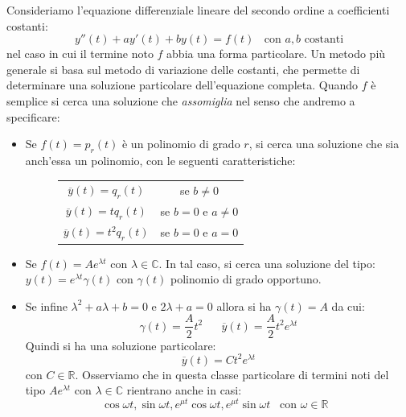\documentclass[a4paper]{article}
\numberwithin{equation}{subsection}
\begin{document}
Consideriamo l'equazione differenziale lineare del secondo ordine a coefficienti costanti:
\[y''(t) + ay'(t) + by(t) = f(t) \; \; \text{ con $a, b$ costanti}\]
nel caso in cui il termine noto $f$ abbia una forma particolare. 
Un metodo più generale si basa sul metodo di variazione delle costanti, che permette di determinare una soluzione particolare dell'equazione completa.
Quando $f$ è semplice si cerca una soluzione che \textit{assomiglia} nel senso che andremo a specificare:
\begin{itemize}
    \item Se $f(t) = p_r(t)$ è un polinomio di grado $r$, si cerca una soluzione che sia anch'essa un polinomio, con le seguenti caratteristiche:
    \begin{figure}[H]
        \centering
        \begin{tabular}{|c|c|}
            \hline
            $\overline{y}(t) = q_r(t)$ & se $b \neq 0$\\
            $\overline{y}(t) = tq_r(t)$ & se $b = 0$ e $a \neq 0$\\
            $\overline{y}(t) = t^2q_r(t)$ & se $b = 0$ e $a = 0$\\
            \hline
        \end{tabular}
    
    \end{figure}
    \item Se $f(t) = Ae^{\lambda t}$ con $\lambda \in \mathbb{C}$. In tal caso, si cerca una soluzione del tipo:
    $y(t) = e^{\lambda t}\gamma(t)$ con $\gamma(t)$ polinomio di grado opportuno.
    \item Se infine $\lambda^2 + a\lambda + b = 0$ e $2\lambda + a = 0$ allora si ha $\gamma(t) = A$ da cui:
    \[\gamma(t) = \frac{A}{2}t^2 \; \; \; \; \; \;  \overline{y}(t) = \frac{A}{2}t^2e^{\lambda t}\] 
    Quindi si ha una soluzione particolare:
    \[\overline{y}(t) = Ct^2e^{\lambda t}\]
    con $C \in \mathbb{R}$. 
    Osserviamo che in questa classe particolare di termini noti del tipo $Ae^{\lambda t}$ con $\lambda \in \mathbb{C}$ rientrano anche in casi:
    \[\cos{\omega t},\sin{\omega t}, e^{\mu t}\cos{\omega t}, e^{\mu t}\sin{\omega t} \; \; \; \text{con $\omega \in \mathbb{R}$ }\]

\end{itemize}
\end{document}
